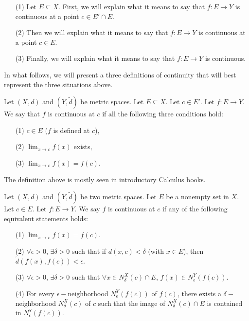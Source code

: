 \documentclass[a4paper]{article}
\begin{document}
\begin{enumerate}
    \item[(1)] Let \( E \subseteq X  \). First, we will explain what it means to say that \( f: E \to Y \) is continuous at a point \( c \in E' \cap E  \).
    \item[(2)] Then we will explain what it means to say that \( f: E \to Y \) is continuous at a point \( c \in E  \). 
    \item[(3)] Finally, we will explain what it means to say that \( f: E \to Y \) is continuous.
\end{enumerate}

In what follows, we will present a three definitions of continuity that will best represent the three situations above.

\begin{definition}
    Let \( (X,d) \) and \( (Y,\tilde{d}) \) be metric spaces. Let \( E \subseteq X  \). Let \( c \in E' \). Let \( f: E \to Y \). We say that \( f  \) is continuous at \( c  \) if all the following three conditions hold:
    \begin{enumerate}
        \item[(1)] \( c \in E  \) (\( f \) is defined at \( c \)),
        \item[(2)] \( \lim_{ x \to c } f(x)  \) exists,
        \item[(3)] \( \lim_{ x \to c } f(x) = f(c) \).
    \end{enumerate}
\end{definition}

The definition above is mostly seen in introductory Calculus books. 

\begin{definition}
    Let \( (X,d) \) and \( (Y,\tilde{d}) \) be two metric spaces. Let \( E  \) be a nonempty set in \( X  \). Let \( c \in E  \). Let \( f: E \to Y \). We say \( f  \) is continuous at \( c  \) if any of the following equivalent statements holds:
\begin{enumerate}
    \item[(1)] \( \lim_{ x \to c } f(x) = f(c) \).
    \item[(2)] \( \forall \epsilon > 0 \), \( \exists \delta > 0 \) such that if \( d(x,c) < \delta \) (with \( x \in E  \)), then \( \tilde{d}(f(x), f(c)) < \epsilon \).
    \item[(3)] \( \forall \epsilon > 0 \), \( \exists \delta > 0  \) such that \( \forall x \in {N}_{\delta}^{X}(c) \cap E  \), \( f(x) \in {N}_{\epsilon}^{Y}(f(c)) \).
    \item[(4)] For every \( \epsilon- \)neighborhood \( {N}_{\epsilon}^{Y}(f(c))  \) of \( f(c) \), there exists a \( \delta- \)neighborhood \( {N}_{\delta}^{X}(c)  \) of \( c  \) such that the image of \( {N}_{\delta}^{X}(c) \cap E  \) is contained in \( {N}_{\epsilon}^{Y}(f(c)) \).
\end{enumerate}  
\end{definition}
 
\end{document}
